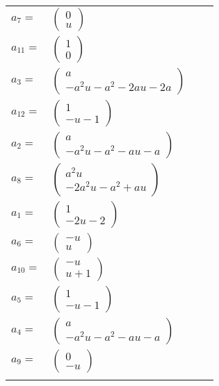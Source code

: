 \documentclass[1p]{elsarticle_modified}
\theoremstyle{definition}
\begin{document}
\begin{tabular}{m{7pt} m{180pt} m{7pt} m{180pt} }
\flushright $a_{7}=$&$\begin{pmatrix}0\\u\end{pmatrix}$ \\
\flushright $a_{11}=$&$\begin{pmatrix}1\\0\end{pmatrix}$ \\
\flushright $a_{3}=$&$\begin{pmatrix}a\\- a^2 u- a^2-2 a u-2 a\end{pmatrix}$ \\
\flushright $a_{12}=$&$\begin{pmatrix}1\\- u-1\end{pmatrix}$ \\
\flushright $a_{2}=$&$\begin{pmatrix}a\\- a^2 u- a^2- a u- a\end{pmatrix}$ \\
\flushright $a_{8}=$&$\begin{pmatrix}a^2 u\\-2 a^2 u- a^2+a u\end{pmatrix}$ \\
\flushright $a_{1}=$&$\begin{pmatrix}1\\-2 u-2\end{pmatrix}$ \\
\flushright $a_{6}=$&$\begin{pmatrix}- u\\u\end{pmatrix}$ \\
\flushright $a_{10}=$&$\begin{pmatrix}- u\\u+1\end{pmatrix}$ \\
\flushright $a_{5}=$&$\begin{pmatrix}1\\- u-1\end{pmatrix}$ \\
\flushright $a_{4}=$&$\begin{pmatrix}a\\- a^2 u- a^2- a u- a\end{pmatrix}$ \\
\flushright $a_{9}=$&$\begin{pmatrix}0\\- u\end{pmatrix}$\\&\end{tabular}
\end{document}
